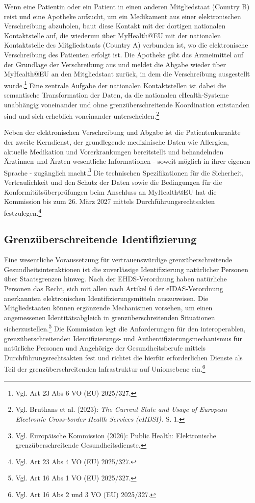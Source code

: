 Wenn eine Patientin oder ein Patient in einen anderen Mitgliedstaat (Country B) reist und eine Apotheke aufsucht, um ein Medikament aus einer elektronischen Verschreibung abzuholen, baut diese Kontakt mit der dortigen nationalen Kontaktstelle auf, die wiederum über MyHealth@EU mit der nationalen Kontaktstelle des Mitgliedstaats (Country A) verbunden ist, wo die elektronische Verschreibung des Patienten erfolgt ist. Die Apotheke gibt das Arzneimittel auf der Grundlage der Verschreibung aus und meldet die Abgabe wieder über MyHealth@EU an den Mitgliedstaat zurück, in dem die Verschreibung ausgestellt wurde.\footnote{Vgl. Art 23 Abs 6 VO (EU) 2025/327.} Eine zentrale Aufgabe der nationalen Kontaktstellen ist dabei die semantische Transformation der Daten, da die nationalen eHealth-Systeme unabhängig voneinander und ohne grenzüberschreitende Koordination entstanden sind und sich erheblich voneinander unterscheiden.\footnote{Vgl. Bruthans et al. (2023): \textit{The Current State and Usage of European Electronic Cross-border Health Services (eHDSI).} S. 1.}

Neben der elektronischen Verschreibung und Abgabe ist die Patientenkurzakte der zweite Kerndienst, der grundlegende medizinische Daten wie Allergien, aktuelle Medikation und Vorerkrankungen bereitstellt und behandelnden Ärztinnen und Ärzten wesentliche Informationen - soweit möglich in ihrer eigenen Sprache - zugänglich macht.\footnote{Vgl. Europäische Kommission (2026): Public Health: Elektronische grenzüberschreitende Gesundheitsdienste.} Die technischen Spezifikationen für die Sicherheit, Vertraulichkeit und den Schutz der Daten sowie die Bedingungen für die Konformitätsüberprüfungen beim Anschluss an MyHealth@EU hat die Kommission bis zum 26. März 2027 mittels Durchführungsrechtsakten festzulegen.\footnote{Vgl. Art 23 Abs 4 VO (EU) 2025/327.}


    \subsection{Grenzüberschreitende Identifizierung}
Eine wesentliche Voraussetzung für vertrauenswürdige grenzüberschreitende Gesundheitsinteraktionen ist die zuverlässige Identifizierung natürlicher Personen über Staatsgrenzen hinweg. Nach der EHDS-Verordnung haben natürliche Personen das Recht, sich mit allen nach Artikel 6 der eIDAS-Verordnung anerkannten elektronischen Identifizierungsmitteln auszuweisen. Die Mitgliedstaaten können ergänzende Mechanismen vorsehen, um einen angemessenen Identitätsabgleich in grenzüberschreitenden Situationen sicherzustellen.\footnote{Vgl. Art 16 Abs 1 VO (EU) 2025/327.} Die Kommission legt die Anforderungen für den interoperablen, grenzüberschreitenden Identifizierungs- und Authentifizierungsmechanismus für natürliche Personen und Angehörige der Gesundheitsberufe mittels Durchführungsrechtsakten fest und richtet die hierfür erforderlichen Dienste als Teil der grenzüberschreitenden Infrastruktur auf Unionsebene ein.\footnote{Vgl. Art 16 Abs 2 und 3 VO (EU) 2025/327.}

